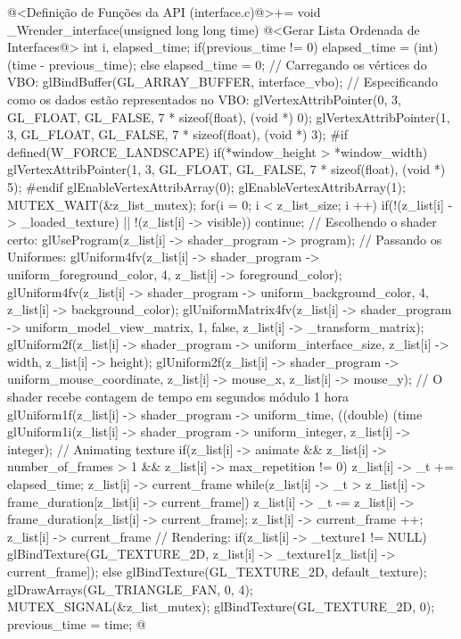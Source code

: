 \iniciocodigo
@<Definição de Funções da API (interface.c)@>+=
void _Wrender_interface(unsigned long long time){
  @<Gerar Lista Ordenada de Interfaces@>
  {
    int i, elapsed_time;
    if(previous_time != 0)
      elapsed_time = (int) (time - previous_time);
    else
      elapsed_time = 0;
    // Carregando os vértices do VBO:
    glBindBuffer(GL_ARRAY_BUFFER, interface_vbo);
    // Especificando como os dados estão representados no VBO:
    glVertexAttribPointer(0, 3, GL_FLOAT, GL_FALSE, 7 * sizeof(float),
                          (void *) 0);
    glVertexAttribPointer(1, 3, GL_FLOAT, GL_FALSE, 7 * sizeof(float),
                          (void *) 3);
#if defined(W_FORCE_LANDSCAPE)
    if(*window_height > *window_width)
      glVertexAttribPointer(1, 3, GL_FLOAT, GL_FALSE, 7 * sizeof(float),
                            (void *) 5);
#endif
    glEnableVertexAttribArray(0);
    glEnableVertexAttribArray(1);
    MUTEX_WAIT(&z_list_mutex);
    for(i = 0; i < z_list_size; i ++){
      if(!(z_list[i] -> _loaded_texture) || !(z_list[i] -> visible))
        continue;
      // Escolhendo o shader certo:
      glUseProgram(z_list[i] -> shader_program -> program);
      // Passando os Uniformes:
      glUniform4fv(z_list[i] -> shader_program -> uniform_foreground_color, 4,
                   z_list[i] -> foreground_color);
      glUniform4fv(z_list[i] -> shader_program -> uniform_background_color, 4,
                   z_list[i] -> background_color);
      glUniformMatrix4fv(z_list[i] -> shader_program ->
                           uniform_model_view_matrix, 1, false,
                         z_list[i] -> _transform_matrix);
      glUniform2f(z_list[i] -> shader_program -> uniform_interface_size,
                  z_list[i] -> width, z_list[i] -> height);
      glUniform2f(z_list[i] -> shader_program -> uniform_mouse_coordinate,
                  z_list[i] -> mouse_x, z_list[i] -> mouse_y);
      // O shader recebe contagem de tempo em segundos módulo 1 hora
      glUniform1f(z_list[i] -> shader_program -> uniform_time,
                  ((double) (time %
      glUniform1i(z_list[i] -> shader_program -> uniform_integer,
                 z_list[i] -> integer);
      // Animating texture
      if(z_list[i] -> animate && z_list[i] -> number_of_frames > 1 &&
         z_list[i] -> max_repetition != 0){
        z_list[i] -> _t += elapsed_time;
        z_list[i] -> current_frame %
        while(z_list[i] -> _t >
                     z_list[i] -> frame_duration[z_list[i] -> current_frame]){
          z_list[i] -> _t -=
            z_list[i] -> frame_duration[z_list[i] -> current_frame];
          z_list[i] -> current_frame ++;
          z_list[i] -> current_frame %
        }
      }
      // Rendering:
      if(z_list[i] -> _texture1 != NULL)
        glBindTexture(GL_TEXTURE_2D,
                      z_list[i] -> _texture1[z_list[i] -> current_frame]);
      else
        glBindTexture(GL_TEXTURE_2D, default_texture);
      glDrawArrays(GL_TRIANGLE_FAN, 0, 4);
    }
    MUTEX_SIGNAL(&z_list_mutex);
    glBindTexture(GL_TEXTURE_2D, 0);
  }
  previous_time = time;
}
@
\fimcodigo


